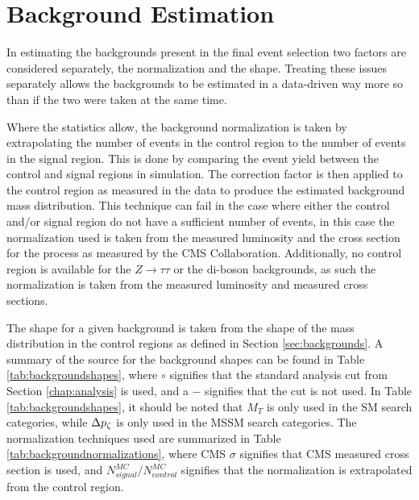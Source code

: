 \section{Background Estimation}
\label{sec:backgroundestimation}
\newcommand{\bgextrap}{N_{signal}^{MC}/N_{control}^{MC}}
In estimating the backgrounds present in the final event selection two factors are considered separately, the normalization and the shape.
Treating these issues separately allows the backgrounds to be estimated in a data-driven way more so than if the two were taken at the same time.

Where the statistics allow, the background normalization is taken by extrapolating the number of events in the control region to the number of events in the signal region.
This is done by comparing the event yield between the control and signal regions in simulation.
The correction factor is then applied to the control region as measured in the data to produce the estimated background mass distribution.
This technique can fail in the case where either the control and/or signal region do not have a sufficient number of events, in this case the normalization used is taken from the measured luminosity and the cross section for the process as measured by the CMS Collaboration.
Additionally, no control region is available for the $Z \rightarrow \tau\tau$ or the di-boson backgrounds, as such the normalization is taken from the measured luminosity and measured cross sections.

The shape for a given background is taken from the shape of the mass distribution in the control regions as defined in Section \ref{sec:backgrounds}.
A summary of the source for the background shapes can be found in Table \ref{tab:backgroundshapes}, where $\circ$ signifies that the standard analysis cut from Section \ref{chap:analysis} is used, and a $-$ signifies that the cut is not used. 
In Table \ref{tab:backgroundshapes}, it should be noted that $M_{T}$ is only used in the SM search categories, while $\Delta p_{\zeta}$ is only used in the MSSM search categories.
The normalization techniques used are summarized in Table \ref{tab:backgroundnormalizations}, where CMS $\sigma$ signifies that CMS measured cross section is used, and $\bgextrap$ signifies that the normalization is extrapolated from the control region.

